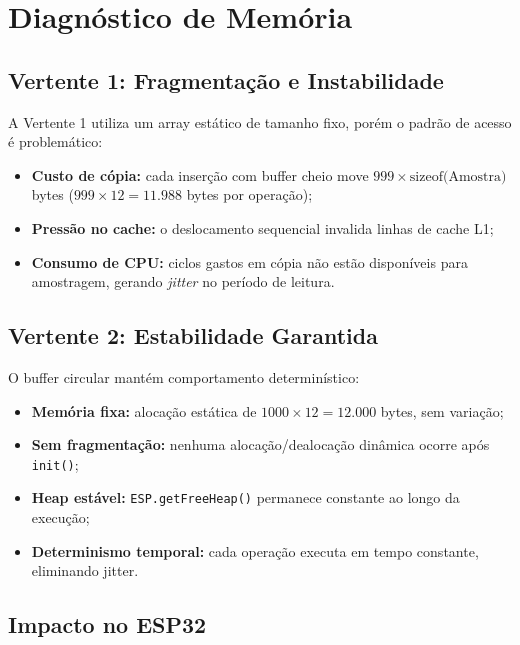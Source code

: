 \documentclass[12pt, a4paper]{article}
\begin{document}
\section{Diagnóstico de Memória}

\subsection{Vertente 1: Fragmentação e Instabilidade}

A Vertente 1 utiliza um array estático de tamanho fixo, porém o padrão de acesso é problemático:

\begin{itemize}
    \item \textbf{Custo de cópia:} cada inserção com buffer cheio move $999 \times \text{sizeof(Amostra)}$ bytes ($999 \times 12 = 11.988$ bytes por operação);
    \item \textbf{Pressão no cache:} o deslocamento sequencial invalida linhas de cache L1;
    \item \textbf{Consumo de CPU:} ciclos gastos em cópia não estão disponíveis para amostragem, gerando \textit{jitter} no período de leitura.
\end{itemize}

\subsection{Vertente 2: Estabilidade Garantida}

O buffer circular mantém comportamento determinístico:

\begin{itemize}
    \item \textbf{Memória fixa:} alocação estática de $1000 \times 12 = 12.000$ bytes, sem variação;
    \item \textbf{Sem fragmentação:} nenhuma alocação/dealocação dinâmica ocorre após \texttt{init()};
    \item \textbf{Heap estável:} \texttt{ESP.getFreeHeap()} permanece constante ao longo da execução;
    \item \textbf{Determinismo temporal:} cada operação executa em tempo constante, eliminando jitter.
\end{itemize}

\subsection{Impacto no ESP32}
\end{document}

